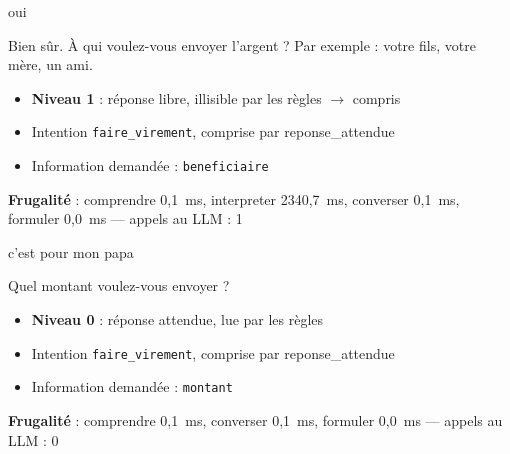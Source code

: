 \documentclass[11pt,a4paper]{article}
\newcommand{\frugal}[1]{{\scriptsize\color{darkgray}\textbf{Frugalité} : #1}\par\medskip}
\begin{document}
\begin{client}oui\end{client}
\begin{assistant}Bien sûr. À qui voulez-vous envoyer l'argent ? Par exemple : votre fils, votre mère, un ami.\end{assistant}
\begin{pourquoi}
\begin{itemize}
\item \textbf{Niveau 1} : réponse libre, illisible par les règles $\rightarrow$ compris
\item Intention \texttt{faire\_virement}, comprise par reponse\_attendue
\item Information demandée : \texttt{beneficiaire}
\end{itemize}
\end{pourquoi}
\frugal{comprendre 0,1~ms, interpreter 2340,7~ms, converser 0,1~ms, formuler 0,0~ms --- appels au LLM : 1}

\begin{client}c'est pour mon papa\end{client}
\begin{assistant}Quel montant voulez-vous envoyer ?\end{assistant}
\begin{pourquoi}
\begin{itemize}
\item \textbf{Niveau 0} : réponse attendue, lue par les règles
\item Intention \texttt{faire\_virement}, comprise par reponse\_attendue
\item Information demandée : \texttt{montant}
\end{itemize}
\end{pourquoi}
\frugal{comprendre 0,1~ms, converser 0,1~ms, formuler 0,0~ms --- appels au LLM : 0}
\end{document}
